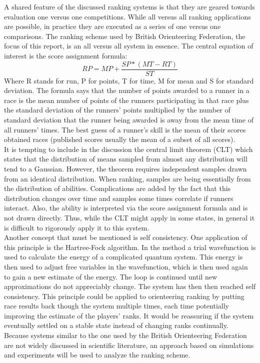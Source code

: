 A shared feature of the discussed ranking systems is that they are geared towards evaluation one versus one competitions. While all versus all ranking applications are possible, in practice they are executed as a series of one versus one comparisons. The ranking scheme used by British Orienteering Federation, the focus of this report, is an all versus all system in essence. The central equation of interest is the score assignment formula\cite{bof}:
\begin{equation}
RP = MP + \frac{SP * (MT - RT)}{ST}
\label{eq:mainEq}
\end{equation}
Where R stands for run, P for points, T for time, M for mean and S for standard deviation. The formula says that the number of points awarded to a runner in a race is the mean number of points of the runners participating in that race plus the standard deviation of the runners' points multiplied by the number of standard deviation that the runner being awarded is away from the mean time of all runners' times. The best guess of a runner's skill is the mean of their scores obtained races (published scores usually the mean of a subset of all scores).\\
It is tempting to include in the discussion the central limit theorem (CLT) which states that the distribution of means sampled from almost any distribution will tend to a Gaussian\cite{probability}. However, the theorem requires independent samples drawn from an identical distribution. When ranking, samples are being essentially from the distribution of abilities. Complications are added by the fact that this distribution changes over time and samples some times correlate if runners interact. Also, the ability is interpreted via the score assignment formula and is not drawn directly. Thus, while the CLT might apply in some states, in general it is difficult to rigorously apply it to this system.\\
Another concept that must be mentioned is self consistency. One application of this principle is the Hartree-Fock algorithm. In the method a trial wavefunction is used to calculate the energy of a complicated quantum system. This energy is then used to adjust free variables in the wavefunction, which is then used again to gain a new estimate of the energy. The loop is continued until new approximations do not appreciably change. The system has then then reached self consistency. This principle could be applied to orienteering ranking by putting race results back though the system multiple times, each time potentially improving the estimate of the players' ranks. It would be reassuring if the system eventually settled on a stable state instead of changing ranks continually.\\
Because systems similar to the one used by the British Orienteering Federation are not widely discussed in scientific literature, an approach based on simulations and experiments will be used to analyze the ranking scheme.